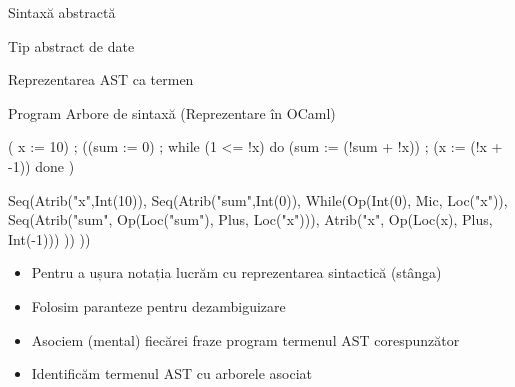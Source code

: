 \documentclass[xcolor=pdftex,romanian,colorlinks]{beamer}
\begin{document}
\begin{section}{Sintaxă abstractă}
\begin{subsection}{Tip abstract de date}

\begin{frame}[fragile]{Reprezentarea AST ca termen}
\begin{block}{Program\hspace{5em} Arbore de sintaxă (Reprezentare în OCaml)}
\begin{minipage}{.25\columnwidth}
\begin{asciic}
( x := 10) ;
((sum := 0) ;
 while (1 <= !x)  
 do 
   (sum := (!sum + !x)) ;
   (x := (!x + -1))
 done
 )
\end{asciic}
\end{minipage}\hfill
\begin{minipage}{.7\columnwidth}
\footnotesize
\begin{asciiml}
 Seq(Atrib("x",Int(10)),
 Seq(Atrib("sum",Int(0)),
     While(Op(Int(0), Mic, Loc("x")),
       Seq(Atrib("sum", Op(Loc("sum"), Plus, Loc("x"))),
           Atrib("x", Op(Loc(x), Plus, Int(-1)))
       ))
 ))
\end{asciiml}
\end{minipage}
\end{block}
\begin{itemize}
\item Pentru a ușura notația lucrăm cu reprezentarea sintactică (stânga)
\item Folosim paranteze pentru dezambiguizare
\item Asociem (mental) fiecărei fraze program termenul AST corespunzător
\item Identificăm termenul AST cu arborele asociat
\end{itemize}
\end{frame}
\end{subsection}
\end{section}
\end{document}
